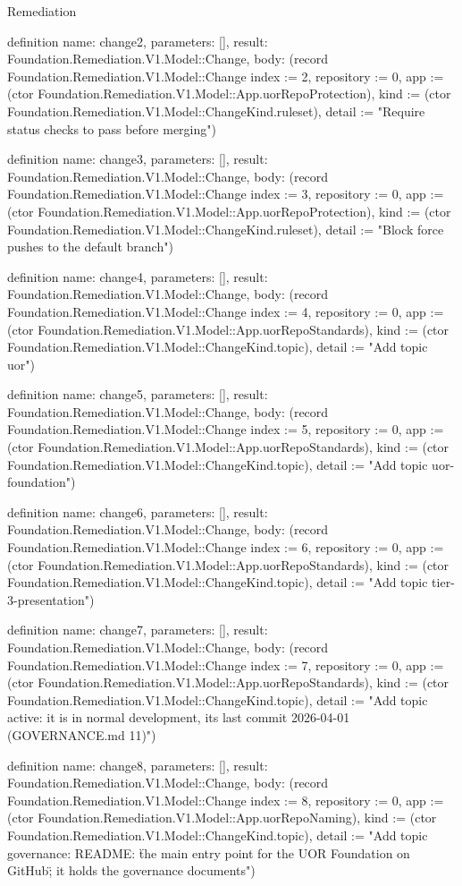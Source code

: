 \begin{lexlean}{Remediation}
\begin{semanticmodule}
definition{
  name: change2,
  parameters: [],
  result: Foundation.Remediation.V1.Model::Change,
  body: (record Foundation.Remediation.V1.Model::Change {index := 2, repository := 0, app := (ctor Foundation.Remediation.V1.Model::App.uorRepoProtection), kind := (ctor Foundation.Remediation.V1.Model::ChangeKind.ruleset), detail := "Require status checks to pass before merging"})
}

definition{
  name: change3,
  parameters: [],
  result: Foundation.Remediation.V1.Model::Change,
  body: (record Foundation.Remediation.V1.Model::Change {index := 3, repository := 0, app := (ctor Foundation.Remediation.V1.Model::App.uorRepoProtection), kind := (ctor Foundation.Remediation.V1.Model::ChangeKind.ruleset), detail := "Block force pushes to the default branch"})
}

definition{
  name: change4,
  parameters: [],
  result: Foundation.Remediation.V1.Model::Change,
  body: (record Foundation.Remediation.V1.Model::Change {index := 4, repository := 0, app := (ctor Foundation.Remediation.V1.Model::App.uorRepoStandards), kind := (ctor Foundation.Remediation.V1.Model::ChangeKind.topic), detail := "Add topic uor"})
}

definition{
  name: change5,
  parameters: [],
  result: Foundation.Remediation.V1.Model::Change,
  body: (record Foundation.Remediation.V1.Model::Change {index := 5, repository := 0, app := (ctor Foundation.Remediation.V1.Model::App.uorRepoStandards), kind := (ctor Foundation.Remediation.V1.Model::ChangeKind.topic), detail := "Add topic uor-foundation"})
}

definition{
  name: change6,
  parameters: [],
  result: Foundation.Remediation.V1.Model::Change,
  body: (record Foundation.Remediation.V1.Model::Change {index := 6, repository := 0, app := (ctor Foundation.Remediation.V1.Model::App.uorRepoStandards), kind := (ctor Foundation.Remediation.V1.Model::ChangeKind.topic), detail := "Add topic tier-3-presentation"})
}

definition{
  name: change7,
  parameters: [],
  result: Foundation.Remediation.V1.Model::Change,
  body: (record Foundation.Remediation.V1.Model::Change {index := 7, repository := 0, app := (ctor Foundation.Remediation.V1.Model::App.uorRepoStandards), kind := (ctor Foundation.Remediation.V1.Model::ChangeKind.topic), detail := "Add topic active: it is in normal development, its last commit 2026-04-01 (GOVERNANCE.md 11)"})
}

definition{
  name: change8,
  parameters: [],
  result: Foundation.Remediation.V1.Model::Change,
  body: (record Foundation.Remediation.V1.Model::Change {index := 8, repository := 0, app := (ctor Foundation.Remediation.V1.Model::App.uorRepoNaming), kind := (ctor Foundation.Remediation.V1.Model::ChangeKind.topic), detail := "Add topic governance: README: \"the main entry point for the UOR Foundation on GitHub\"; it holds the governance documents"})
}


\end{semanticmodule}
\end{lexlean}
